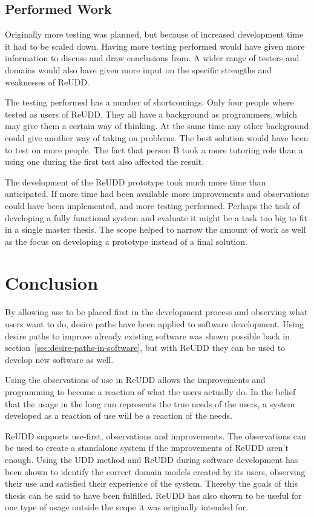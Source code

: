 \documentclass[a4paper]{report}
\begin{document}
\subsection{Performed Work}
Originally more testing was planned, but because of increased development time it had to be scaled down. Having more testing performed would have given more information to discuss and draw conclusions from. A wider range of testers and domains would also have given more input on the specific strengths and weaknesses of ReUDD.

The testing performed has a number of shortcomings. Only four people where tested as users of ReUDD. They all have a background as programmers, which may give them a certain way of thinking. At the same time any other background could give another way of taking on problems. The best solution would have been to test on more people. The fact that person B took a more tutoring role than a using one during the first test also affected the result.

The development of the ReUDD prototype took much more time than anticipated. If more time had been available more improvements and observations could have been implemented, and more testing performed. Perhaps the task of developing a fully functional system and evaluate it might be a task too big to fit in a single master thesis. The scope helped to narrow the amount of work as well as the focus on developing a prototype instead of a final solution.

\section{Conclusion}
By allowing use to be placed first in the development process and observing what users want to do, desire paths have been applied to software development. Using desire paths to improve already existing software was shown possible back in section~\ref{sec:desire-paths-in-software}, but with ReUDD they can be used to develop new software as well.

Using the observations of use in ReUDD allows the improvements and programming to become a reaction of what the users actually do. In the belief that the usage in the long run represents the true needs of the users, a system developed as a reaction of use will be a reaction of the needs.

ReUDD supports use-first, observations and improvements. The observations can be used to create a standalone system if the improvements of ReUDD aren't enough. Using the UDD method and ReUDD during software development has been shown to identify the correct domain models created by its users, observing their use and satisfied their experience of the system. Thereby the goals of this thesis can be said to have been fulfilled. ReUDD has also shown to be useful for one type of usage outside the scope it was originally intended for.
\end{document}
